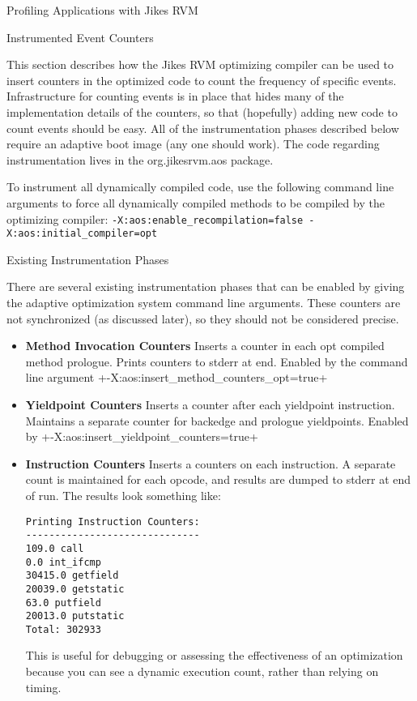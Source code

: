 \begin{chapter}{Profiling Applications with Jikes RVM}
\begin{section}{Instrumented Event Counters}

This section describes how the Jikes RVM optimizing compiler can be used to insert counters in the optimized code to count the frequency of specific events. Infrastructure for counting events is in place that hides many of the implementation details of the counters, so that (hopefully) adding new code to count events should be easy. All of the instrumentation phases described below require an adaptive boot image (any one should work). The code regarding instrumentation lives in the org.jikesrvm.aos package.

To instrument all dynamically compiled code, use the following command line arguments to force all dynamically compiled methods to be compiled by the optimizing compiler: \texttt{-X:aos:enable\_recompilation=false -X:aos:initial\_compiler=opt}

\begin{subsection}{Existing Instrumentation Phases}

There are several existing instrumentation phases that can be enabled by giving the adaptive optimization system command line arguments. These counters are not synchronized (as discussed later), so they should not be considered precise.

\begin{itemize}
  \item \textbf{Method Invocation Counters} Inserts a counter in each opt compiled method prologue. Prints counters to stderr at end. Enabled by the command line argument \spverb+-X:aos:insert_method_counters_opt=true+
  \item \textbf{Yieldpoint Counters} Inserts a counter after each yieldpoint instruction. Maintains a separate counter for backedge and prologue yieldpoints. Enabled by \spverb+-X:aos:insert_yieldpoint_counters=true+
  \item \textbf{Instruction Counters} Inserts a counters on each instruction. A separate count is maintained for each opcode, and results are dumped to stderr at end of run. The results look something like:
    \begin{lstlisting}
Printing Instruction Counters:
------------------------------
109.0 call
0.0 int_ifcmp
30415.0 getfield
20039.0 getstatic
63.0 putfield
20013.0 putstatic
Total: 302933
    \end{lstlisting}
    This is useful for debugging or assessing the effectiveness of an optimization because you can see a dynamic execution count, rather than relying on timing.


\end{itemize}
\end{subsection}
\end{section}
\end{chapter}
